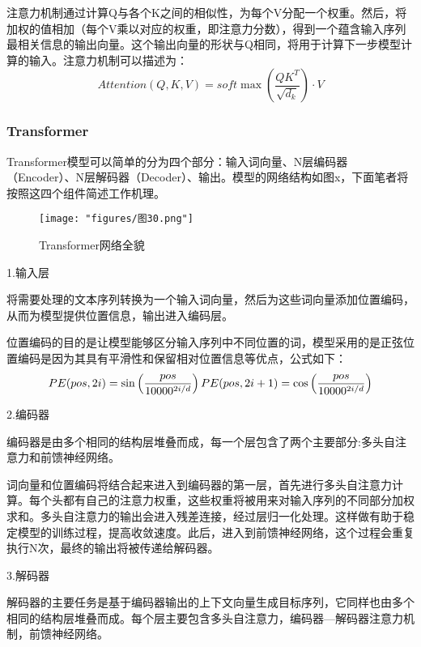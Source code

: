 注意力机制通过计算Q与各个K之间的相似性，为每个V分配一个权重。然后，将加权的值相加（每个V乘以对应的权重，即注意力分数），得到一个蕴含输入序列最相关信息的输出向量。这个输出向量的形状与Q相同，将用于计算下一步模型计算的输入。注意力机制可以描述为：
\begin{equation}Attention\left(Q,K,V\right)=soft\max\left(\frac{QK^T}{\sqrt{d_k}}\right)\cdot V\end{equation}

\subsubsection{Transformer}
Transformer模型可以简单的分为四个部分：输入词向量、N层编码器（Encoder）、N层解码器（Decoder）、输出。模型的网络结构如图x，下面笔者将按照这四个组件简述工作机理。
\begin{figure}[ht] %
	\centering
	\texttt{[image: "figures/图30.png"]} %
	\caption{Transformer网络全貌} %
	\label{fig:example} %
\end{figure}

1.输入层

将需要处理的文本序列转换为一个输入词向量，然后为这些词向量添加位置编码，从而为模型提供位置信息，输出进入编码层。

位置编码的目的是让模型能够区分输入序列中不同位置的词，模型采用的是正弦位置编码是因为其具有平滑性和保留相对位置信息等优点，公式如下：
\begin{equation}PE(pos,2i)=\sin\left(\frac{pos}{10000^{2i/d}}\right)\\PE(pos,2i+1)=\cos\left(\frac{pos}{10000^{2i/d}}\right)\end{equation}

2.编码器

编码器是由多个相同的结构层堆叠而成，每一个层包含了两个主要部分:多头自注意力和前馈神经网络。

词向量和位置编码将结合起来进入到编码器的第一层，首先进行多头自注意力计算。每个头都有自己的注意力权重，这些权重将被用来对输入序列的不同部分加权求和。多头自注意力的输出会进入残差连接，经过层归一化处理。这样做有助于稳定模型的训练过程，提高收敛速度。此后，进入到前馈神经网络，这个过程会重复执行N次，最终的输出将被传递给解码器。

3.解码器

解码器的主要任务是基于编码器输出的上下文向量生成目标序列，它同样也由多个相同的结构层堆叠而成。每个层主要包含多头自注意力，编码器—解码器注意力机制，前馈神经网络。

